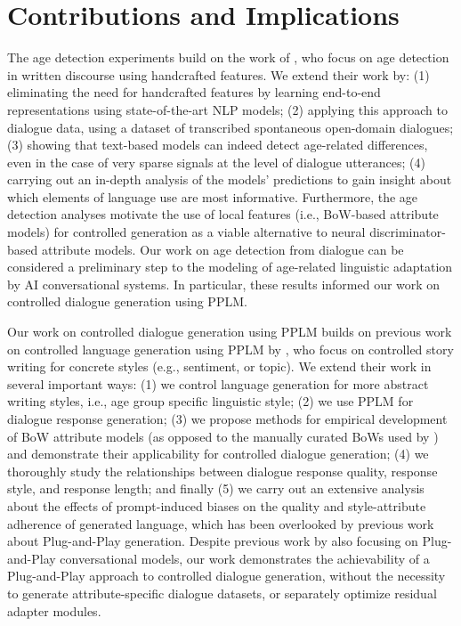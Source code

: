 \section{Contributions and Implications}

The age detection experiments build on the work of \cite{schler2006effects}, who focus on age detection in written discourse using handcrafted features. We extend their work by: (1) eliminating the need for handcrafted features by learning end-to-end representations using state-of-the-art NLP models; (2) applying this approach to dialogue data, using a dataset of transcribed spontaneous open-domain dialogues; (3) showing that text-based models can indeed detect age-related differences, even in the case of very sparse signals at the level of dialogue utterances; (4) carrying out an in-depth analysis of the models' predictions to gain insight about which elements of language use are most informative. Furthermore, the age detection analyses motivate the use of local features (i.e., BoW-based attribute models) for controlled generation as a viable alternative to neural discriminator-based attribute models. Our work on age detection from dialogue can be considered a preliminary step to the modeling of age-related linguistic adaptation by AI conversational systems. In particular, these results informed our work on controlled dialogue generation using PPLM.

Our work on controlled dialogue generation using PPLM builds on previous work on controlled language generation using PPLM by \cite{dathathri2019plug}, who focus on controlled story writing for concrete styles (e.g., sentiment, or topic). We extend their work in several important ways: (1) we control language generation for more abstract writing styles, i.e., age group specific linguistic style; (2) we use PPLM for dialogue response generation; (3) we propose methods for empirical development of BoW attribute models (as opposed to the manually curated BoWs used by \cite{dathathri2019plug}) and demonstrate their applicability for controlled dialogue generation; (4) we thoroughly study the relationships between dialogue response quality, response style, and response length; 
and finally (5) we carry out an extensive analysis about the effects of prompt-induced biases on the quality and style-attribute adherence of generated language, which has been overlooked by previous work about Plug-and-Play generation. Despite previous work by \cite{madotto-etal-2020-plug} also focusing on Plug-and-Play conversational models, our work demonstrates the achievability of a Plug-and-Play approach to controlled dialogue generation, without the necessity to generate attribute-specific dialogue datasets, or separately optimize residual adapter modules.

